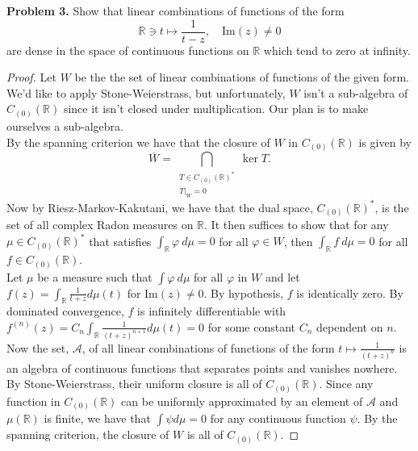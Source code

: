 \documentclass[11pt,letterpaper]{report}
\newcommand{\reals}{\mathbb{R}}
\newcommand{\mcal}[1]{\mathcal{#1}}
\begin{document}
\noindent\textbf{Problem 3. }
Show that linear combinations of functions of the form
\[
\reals \ni t\mapsto \frac{1}{t-z},\quad \text{Im}(z)\neq 0
\]
are dense in the space of continuous functions on $\reals$ which tend to zero at infinity.
\begin{proof}
	Let $W$ be the the set of linear combinations of functions of the given form. We'd like to apply Stone-Weierstrass, but unfortunately, $W$ isn't a sub-algebra of $C_{(0)}(\reals)$ since it isn't closed under multiplication. Our plan is to make ourselves a sub-algebra.\\
	By the spanning criterion we have that the closure of $W$ in $C_{(0)}(\reals)$ is given by
	\[
	\overline{W} = \bigcap_{\substack{T\in C_{(0)}(\reals)^*\\T|_{W} = 0}} \ker T.
	\]
	Now by Riesz-Markov-Kakutani, we have that the dual space, $C_{(0)}(\reals)^*$, is the set of all complex Radon measures on $\reals$. It then suffices to show that for any $\mu \in C_{(0)}(\reals)^*$ that satisfies $\int_\reals \varphi\ d\mu = 0$ for all $\varphi\in W$, then $\int_\reals f\ d\mu = 0$ for all $f\in C_{(0)}(\reals)$.\\
	
	Let $\mu$ be a measure such that $\int \varphi\ d\mu$ for all $\varphi$ in $W$ and let $f(z) = \int_\reals \frac{1}{t+z}d\mu(t)$ for Im$(z)\neq 0$. By hypothesis, $f$ is identically zero. By dominated convergence, $f$ is infinitely differentiable with $f^{(n)}(z) = C_n\int_\reals \frac{1}{(t+z)^{n+1}}d\mu(t) = 0$ for some constant $C_n$ dependent on $n$.\\

	Now the set, $\mcal{A}$, of all linear combinations of functions of the form $t\mapsto \frac{1}{(t+z)^n}$ is an algebra of continuous functions that separates points and vanishes nowhere. By Stone-Weierstrass, their uniform closure is all of $C_{(0)}(\reals)$.
	Since any function in $C_{(0)}(\reals)$ can be uniformly approximated by an element of $\mcal{A}$ and $\mu(\reals)$ is finite, we have that $\int \psi d\mu = 0$ for any continuous function $\psi$. By the spanning criterion, the closure of $W$ is all of $C_{(0)}(\reals)$.
\end{proof}
\end{document}
